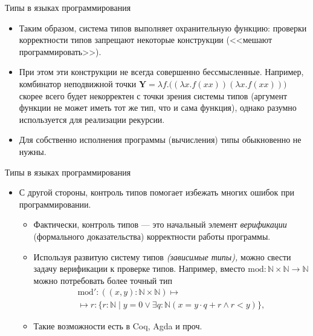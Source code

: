 \documentclass[xcolor=dvipsnames]{beamer}
\newcommand{\NN}{\mathbb{N}}
\newcommand{\Yx}{\mathbf{Y}}
\begin{document}
\begin{frame}{Типы в языках программирования}

\begin{itemize}[<+->]
 \item Таким образом, система типов выполняет охранительную функцию: проверки корректности типов запрещают некоторые конструкции (<<мешают программировать>>).
 \item При этом эти конструкции не всегда совершенно бессмысленные. Например, комбинатор неподвижной точки $\Yx = \lambda f. \bigl(
 (\lambda x. f(xx)) (\lambda x. f(xx)) \bigr)$ скорее всего будет некорректен с точки зрения системы типов (аргумент функции не может иметь тот же тип, что и сама функция), однако разумно используется для реализации рекурсии.
 \item Для собственно исполнения программы (вычисления) типы обыкновенно не нужны.
\end{itemize}

 
\end{frame}

\begin{frame}{Типы в языках программирования}
 
 \begin{itemize}[<+->]
  \item С другой стороны, контроль типов помогает избежать многих ошибок при программировании.
  \begin{itemize}
    \item Фактически, контроль типов --- это начальный элемент {\em верификации} (формального доказательства) корректности работы программы.
    \item Используя развитую систему типов {\em (зависимые типы),} можно свести задачу верификации к проверке типов. Например, вместо
    \( \mathrm{mod} \colon 
     \NN \times \NN \to \NN
    \)
    можно потребовать более точный тип
    \begin{multline*}
     \mathrm{mod}' \colon
     ((x,y) : \NN \times \NN) \mapsto\\\mapsto
     r : \{ r : \NN \mid y = 0 \vee \exists q : \NN
     (x = y\cdot q + r \wedge r < y) \},
    \end{multline*}
    \item Такие возможности есть в Coq, Agda и проч.
  \end{itemize}
 \end{itemize}

 
\end{frame}
\end{document}
